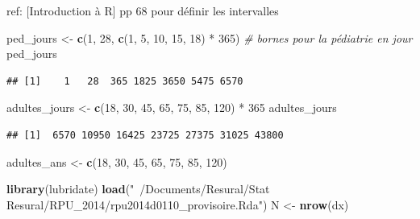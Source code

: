 \documentclass[]{article}
\newenvironment{Shaded}{\begin{snugshade}}{\end{snugshade}}
\newcommand{\KeywordTok}[1]{\textcolor[rgb]{0.13,0.29,0.53}{\textbf{{#1}}}}
\newcommand{\DecValTok}[1]{\textcolor[rgb]{0.00,0.00,0.81}{{#1}}}
\newcommand{\StringTok}[1]{\textcolor[rgb]{0.31,0.60,0.02}{{#1}}}
\newcommand{\CommentTok}[1]{\textcolor[rgb]{0.56,0.35,0.01}{\textit{{#1}}}}
\newcommand{\NormalTok}[1]{{#1}}
\begin{document}
ref: {[}Introduction à R{]} pp 68 pour définir les intervalles

\begin{Shaded}
\begin{Highlighting}[]
\NormalTok{ped_jours <-}\StringTok{ }\KeywordTok{c}\NormalTok{(}\DecValTok{1}\NormalTok{, }\DecValTok{28}\NormalTok{, }\KeywordTok{c}\NormalTok{(}\DecValTok{1}\NormalTok{, }\DecValTok{5}\NormalTok{, }\DecValTok{10}\NormalTok{, }\DecValTok{15}\NormalTok{, }\DecValTok{18}\NormalTok{) *}\StringTok{ }\DecValTok{365}\NormalTok{) }\CommentTok{# bornes pour la pédiatrie en jour}
\NormalTok{ped_jours}
\end{Highlighting}
\end{Shaded}

\begin{verbatim}
## [1]    1   28  365 1825 3650 5475 6570
\end{verbatim}

\begin{Shaded}
\begin{Highlighting}[]
\NormalTok{adultes_jours <-}\StringTok{ }\KeywordTok{c}\NormalTok{(}\DecValTok{18}\NormalTok{, }\DecValTok{30}\NormalTok{, }\DecValTok{45}\NormalTok{, }\DecValTok{65}\NormalTok{, }\DecValTok{75}\NormalTok{, }\DecValTok{85}\NormalTok{, }\DecValTok{120}\NormalTok{) *}\StringTok{ }\DecValTok{365}
\NormalTok{adultes_jours}
\end{Highlighting}
\end{Shaded}

\begin{verbatim}
## [1]  6570 10950 16425 23725 27375 31025 43800
\end{verbatim}

\begin{Shaded}
\begin{Highlighting}[]
\NormalTok{adultes_ans <-}\StringTok{ }\KeywordTok{c}\NormalTok{(}\DecValTok{18}\NormalTok{, }\DecValTok{30}\NormalTok{, }\DecValTok{45}\NormalTok{, }\DecValTok{65}\NormalTok{, }\DecValTok{75}\NormalTok{, }\DecValTok{85}\NormalTok{, }\DecValTok{120}\NormalTok{)}
\end{Highlighting}
\end{Shaded}

\begin{Shaded}
\begin{Highlighting}[]
\KeywordTok{library}\NormalTok{(lubridate)}
\KeywordTok{load}\NormalTok{(}\StringTok{"~/Documents/Resural/Stat Resural/RPU_2014/rpu2014d0110_provisoire.Rda"}\NormalTok{)}
\NormalTok{N <-}\StringTok{ }\KeywordTok{nrow}\NormalTok{(dx)}
\end{Highlighting}
\end{Shaded}
\end{document}

